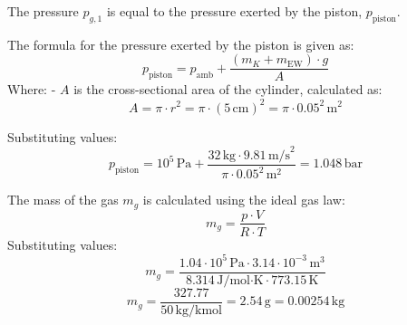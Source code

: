 The pressure \( p_{g,1} \) is equal to the pressure exerted by the piston, \( p_{\text{piston}} \).  

The formula for the pressure exerted by the piston is given as:  
\[
p_{\text{piston}} = p_{\text{amb}} + \frac{(m_K + m_{\text{EW}}) \cdot g}{A}
\]  
Where:  
- \( A \) is the cross-sectional area of the cylinder, calculated as:  
\[
A = \pi \cdot r^2 = \pi \cdot (5 \, \text{cm})^2 = \pi \cdot 0.05^2 \, \text{m}^2
\]  

Substituting values:  
\[
p_{\text{piston}} = 10^5 \, \text{Pa} + \frac{32 \, \text{kg} \cdot 9.81 \, \text{m/s}^2}{\pi \cdot 0.05^2 \, \text{m}^2} = 1.048 \, \text{bar}
\]  

The mass of the gas \( m_g \) is calculated using the ideal gas law:  
\[
m_g = \frac{p \cdot V}{R \cdot T}
\]  
Substituting values:  
\[
m_g = \frac{1.04 \cdot 10^5 \, \text{Pa} \cdot 3.14 \cdot 10^{-3} \, \text{m}^3}{8.314 \, \text{J/mol·K} \cdot 773.15 \, \text{K}}
\]  
\[
m_g = \frac{327.77}{50 \, \text{kg/kmol}} = 2.54 \, \text{g} = 0.00254 \, \text{kg}
\]